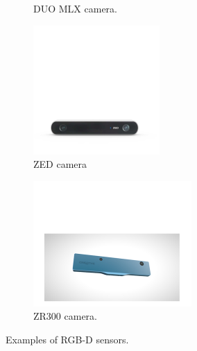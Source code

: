 \begin{figure}[H]
\begin{subfigure}[H]{0.4\linewidth}
        \caption{{DUO MLX camera.}}
        \label{fig:2.15b}
    \end{subfigure}
    \begin{subfigure}[H]{0.4\linewidth}
        \centering
        \includegraphics[width=\linewidth]{assets/2_15_c.png}
        \caption{{ZED camera}}
        \label{fig:2.15c}
    \end{subfigure}
    \begin{subfigure}[H]{0.4\linewidth}
        \centering
        \includegraphics[width=\linewidth]{assets/2_15_d.png}
        \caption{{ZR300 camera.}}
        \label{fig:2.15d}
    \end{subfigure}
    \caption{Examples of RGB-D sensors.}
    \label{fig:2.15}
\end{figure}

